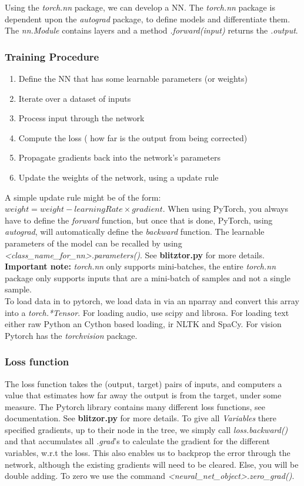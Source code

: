 \documentclass[]{report}
\newcommand{\tif}{\textit}
\newcommand{\tbf}{\textbf}
\begin{document}
Using the \textit{torch.nn} package, we can develop a NN. The \textit{torch.nn} package is dependent upon the \textit{autograd} package, to define models and differentiate them.  The \tif{nn.Module} contains layers and a method \tif{.forward(input)} returns the \tif{.output}. 

\subsubsection{Training Procedure}
\begin{enumerate}
	\item Define the NN that has some learnable parameters (or weights) 
	\item Iterate over a dataset of inputs
	\item Process input through the network
	\item Compute the loss ( how far is the output from being corrected)
	\item Propagate gradients back into the network's parameters
	\item Update the weights of the network, using a update rule
\end{enumerate} 

A simple update rule might be of the form: $weight = weight - learningRate \times gradient$. When using PyTorch, you always have to define the \tif{forward} function, but once that is done, PyTorch, using \tif{autograd}, will automatically define the \tif{backward} function.  The learnable parameters of the model can be recalled by using \textit{<class\_name\_for\_nn>.parameters()}. See \tbf{blitztor.py} for more details.\\

\tbf{Important note: } \tif{torch.nn} only supports mini-batches, the entire \tif{torch.nn} package only supports inputs that are a mini-batch of samples and not a single sample.\\

To load data in to pytorch, we load data in via an nparray and convert this array into a \textit{torch.*Tensor}.
For loading audio, use scipy and librosa. For loading text either raw Python an Cython based loading, ir NLTK and SpaCy. For vision Pytorch has the \tif{torchvision} package.  
  
 
\subsubsection{Loss function}

The loss function takes the (output, target) pairs of inputs, and computers a value that estimates how far away the output is from the target, under some measure. The Pytorch library contains many different loss functions, see documentation. See \tbf{blitzor.py} for more details.
To give all \tif{Variables} there specified gradients, up to their node in the tree, 
we simply call \tif{loss.backward()} and that accumulates all \tif{.grad}'s to calculate the gradient for the different variables, w.r.t the loss.
This also enables us to backprop the error through the network, although the existing gradients will need to be cleared. Else, you will be double adding. To zero we use the command \textit{<neural\_net\_object>.zero\_grad()}.
\end{document}
